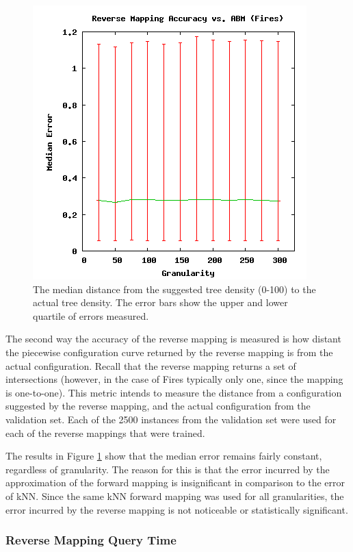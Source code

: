 \begin{figure}[ht]
\centering
\includegraphics[scale=.5]{images/results_fires/rmaccabm.png}
\caption{The median distance from the suggested tree density (0-100) to the actual tree density.
The error bars show the upper and lower quartile of errors measured.}
\label{fig:rmaccabm}
\end{figure}
The second way the accuracy of the reverse mapping is measured is how distant the piecewise configuration curve returned by the reverse mapping is from the actual configuration.
Recall that the reverse mapping returns a set of intersections (however, in the case of Fires typically only one, since the mapping is one-to-one).
This metric intends to measure the distance from a configuration suggested by the reverse mapping, and the actual configuration from the validation set.
Each of the 2500 instances from the validation set were used for each of the reverse mappings that were trained.

The results in Figure \ref{fig:rmaccabm} show that the median error remains fairly constant, regardless of granularity.
The reason for this is that the error incurred by the approximation of the forward mapping is insignificant in comparison to the error of kNN.
Since the same kNN forward mapping was used for all granularities, the error incurred by the reverse mapping is not noticeable or statistically significant.


\subsubsection{Reverse Mapping Query Time}

